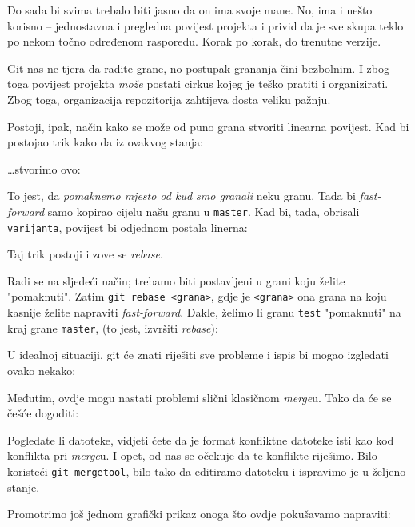 Do sada bi svima trebalo biti jasno da on ima svoje mane.
No, ima i nešto korisno -- jednostavna i pregledna povijest projekta i privid da je sve skupa teklo po nekom točno određenom rasporedu.
Korak po korak, do trenutne verzije.

Git nas ne tjera da radite grane, no postupak grananja čini bezbolnim. 
I zbog toga povijest projekta \emph{može} postati cirkus kojeg je teško pratiti i organizirati.
Zbog toga, organizacija repozitorija zahtijeva dosta veliku pažnju.

Postoji, ipak, način kako se može od puno grana stvoriti linearna povijest.
Kad bi postojao trik kako da iz ovakvog stanja:



\dots{}stvorimo ovo:



To jest, da \emph{pomaknemo mjesto od kud smo granali} neku granu. 
Tada bi \emph{fast-forward} samo kopirao cijelu našu granu u \verb+master+.
Kad bi, tada, obrisali \verb+varijanta+, povijest bi odjednom postala linerna:



Taj trik postoji i zove se \emph{rebase}.

Radi se na sljedeći način; trebamo biti postavljeni u grani koju želite "pomaknuti". Zatim \verb+git rebase <grana>+, gdje je \verb+<grana>+ ona grana na koju kasnije želite napraviti \emph{fast-forward}. 
Dakle, želimo li granu \verb+test+ "pomaknuti" na kraj grane \verb+master+, (to jest, izvršiti \emph{rebase}):


U idealnoj situaciji, git će znati riješiti sve probleme i ispis bi mogao izgledati ovako nekako:



Međutim, ovdje mogu nastati problemi slični klasičnom \emph{merge}u.
Tako da će se češće dogoditi:



Pogledate li datoteke, vidjeti ćete da je format konfliktne datoteke isti kao kod konflikta pri \emph{merge}u.
I opet, od nas se očekuje da te konflikte riješimo.
Bilo koristeći \verb+git mergetool+, bilo tako da editiramo datoteku i ispravimo je u željeno stanje. 

Promotrimo još jednom grafički prikaz onoga što ovdje pokušavamo napraviti:

